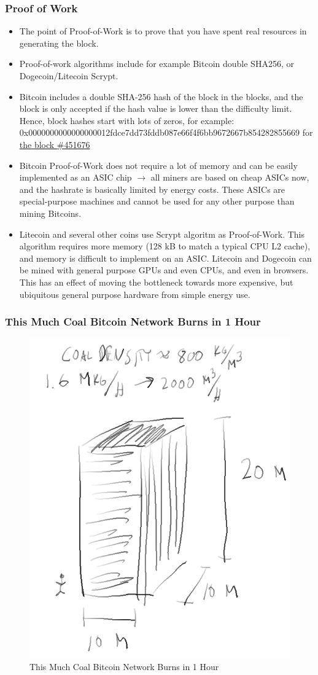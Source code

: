 \documentclass[8pt]{beamer}
\begin{document}
\begin{frame}
\frametitle{Proof of Work}

\begin{itemize}
 \item The point of Proof-of-Work is to prove that you have spent real resources in generating the block.
 \item Proof-of-work algorithms include for example Bitcoin double SHA256, or Dogecoin/Litecoin Scrypt.
 \item Bitcoin includes a double SHA-256 hash of the block in the blocks, and the block is only accepted if the hash value is lower than the difficulty limit. Hence, block hashes start with lots of zeros, for example:
       0x0000000000000000012fdce7dd73fddb087e66f4f6bb9672667b854282855669 for \href{https://blockexplorer.com/block/0000000000000000012fdce7dd73fddb087e66f4f6bb9672667b854282855669}{the block \#451676}
 \item Bitcoin Proof-of-Work does not require a lot of memory and can be easily implemented as an ASIC chip $ \rightarrow $ all miners are based on cheap ASICs now, and the hashrate is basically limited by energy costs.
       These ASICs are special-purpose machines and cannot be used for any other purpose than mining Bitcoins.
 \item Litecoin and several other coins use Scrypt algoritm as Proof-of-Work. This algorithm requires more memory (128 kB to match a typical CPU L2 cache), and memory is difficult to implement on an ASIC.
       Litecoin and Dogecoin can be mined with general purpose GPUs and even CPUs, and even in browsers. This has an effect of moving the bottleneck towards more expensive, but ubiquitous general purpose hardware
       from simple energy use.
\end{itemize}
\end{frame}

\begin{frame}
\frametitle{This Much Coal Bitcoin Network Burns in 1 Hour}

\begin{figure}[tb]
 \centering
 \includegraphics[width=5 cm,keepaspectratio=true]{./blockchain_images/coal.png}
 \caption{This Much Coal Bitcoin Network Burns in 1 Hour}
\end{figure}

\end{frame}
\end{document}
